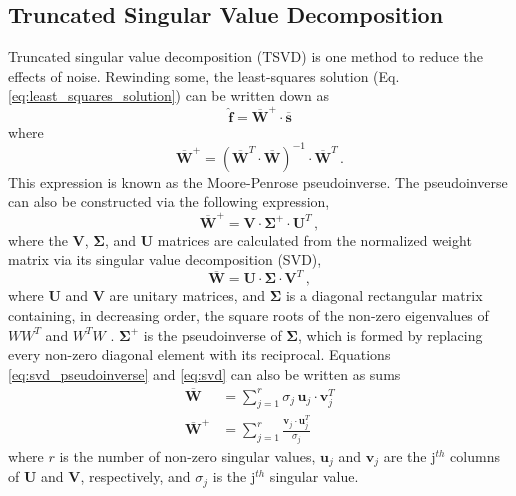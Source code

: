 \subsection{Truncated Singular Value Decomposition} \label{sec:tsvd}
Truncated singular value decomposition (TSVD) is one method to reduce the effects of noise.
Rewinding some, the least-squares solution (Eq. \ref{eq:least_squares_solution}) can be written down as 
\begin{equation}
    \mathbf{\hat{f}} = \mathbf{\overline{W}}^+ \cdot \mathbf{\overline{s}}
\end{equation}
where
\begin{equation}\label{eq:pseudoinverse}
    \mathbf{\overline{W}}^+ = \left(\mathbf{\overline{W}}^T\cdot\mathbf{\overline{W}}\right)^{-1}\cdot\mathbf{\overline{W}}^T\,.
\end{equation}
This expression is known as the Moore-Penrose pseudoinverse. The pseudoinverse can also be constructed via the following expression,
\begin{equation}\label{eq:svd_pseudoinverse}
    \mathbf{\overline{W}}^+ = \mathbf{V} \cdot \mathbf{\Sigma}^+ \cdot \mathbf{U}^T \, ,
\end{equation}
where the $\mathbf{V}$, $\mathbf{\Sigma}$, and $\mathbf{U}$ matrices are calculated from the normalized weight matrix via its singular value decomposition (SVD),
\begin{equation} \label{eq:svd}
    \mathbf{\overline{W}} = \mathbf{U} \cdot \mathbf{\Sigma} \cdot \mathbf{V}^T \,,
\end{equation}
where $\mathbf{U}$ and $\mathbf{V}$ are unitary matrices, and $\mathbf{\Sigma}$ is a diagonal rectangular matrix containing, in decreasing order, the square roots of the non-zero eigenvalues of $WW^T$ and $W^T W$ \cite{Strang}. $\mathbf{\Sigma}^+$ is the pseudoinverse of $\mathbf{\Sigma}$, which is formed by replacing every non-zero diagonal element with its reciprocal.
Equations \ref{eq:svd_pseudoinverse} and \ref{eq:svd} can also be written as sums
\begin{equation}
\begin{split}
    \mathbf{\overline{W}} &= \sum_{j=1}^r \sigma_j\, \mathbf{u}_j \cdot \mathbf{v}_j^T  \\
    \mathbf{\overline{W}}^+ &= \sum_{j=1}^r \frac{\mathbf{v}_j \cdot \mathbf{u}_j^T}{\sigma_j}
\end{split}
\end{equation}
where $r$ is the number of non-zero singular values, $\mathbf{u}_j$ and $\mathbf{v}_j$ are the j$^{th}$ columns of $\mathbf{U}$ and $\mathbf{V}$, respectively, and $\sigma_j$ is the j$^{th}$ singular value.

